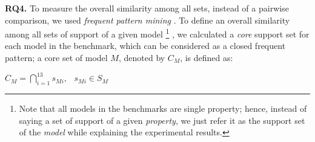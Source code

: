 \vspace{6pt}
\noindent{}
\vspace{6pt}
%
%
%
%
%
%
%
%
%
%

\textbf{RQ4.} To measure the overall similarity among all sets, instead of a pairwise comparison, we used \emph{frequent pattern mining} \cite{han2007frequent}. To define an overall similarity among all sets of support of a given model
\footnote{Note that all models in the benchmarks are single property; hence, instead of saying a set of support of a given \emph{property}, we just refer it as the support set of the \emph{model} while explaining the experimental results.}
, we calculated a \emph{core} support set for each model in the benchmark, which can be considered as a closed frequent pattern; a core set of model $M$, denoted by $C_M$, is defined as:
\begin{definition}
  \label{def:core}
  $C_M = \bigcap_{i=1}^{13} s_{Mi},   \hspace{9pt} s_{Mi} \in S_M$
\end{definition}

